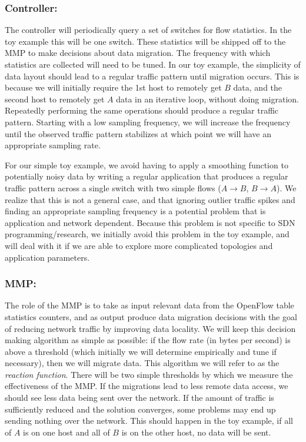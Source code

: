 \documentclass[12pt]{article} \usepackage{graphicx} \usepackage{amsmath}
\begin{document}
\subsubsection*{Controller:} \label{controller} The controller will periodically
query a set of switches for flow statistics. In the toy example this will be one
switch.  These statistics will be shipped off to the MMP to make decisions about
data migration.  The frequency with which statistics are collected will need to
be tuned.  In our toy example, the simplicity of data layout should lead to a
regular traffic pattern until migration occurs.  This is because we will
initially require the 1st host to remotely get $B$ data, and the second host to
remotely get $A$ data in an iterative loop, without doing migration.  Repeatedly
performing the same operations should produce a regular traffic pattern.
Starting with a low sampling frequency, we will increase the frequency until the
observed traffic pattern stabilizes at which point we will have an appropriate
sampling rate.

For our simple toy example, we avoid having to apply a smoothing function to
potentially noisy data by writing a regular application that produces a regular
traffic pattern across a single switch with two simple flows ($A\rightarrow B$,
$B\rightarrow A$).  We realize that this is not a general case, and that
ignoring outlier traffic spikes and finding an appropriate sampling frequency is
a potential problem that is application and network dependent.  Because this
problem is not specific to SDN programming/research, we initially avoid this
problem in the toy example, and will deal with it if we are able to explore more complicated
topologies and application parameters. %


\subsubsection*{MMP:} \label{mmp} The role of the MMP is to take as input
relevant data from the OpenFlow table statistics counters, and as output produce
data migration decisions with the goal of reducing network traffic by improving
data locality.  We will keep this decision making algorithm as simple as
possible: if the flow rate (in bytes per second) is above a threshold (which
initially we will determine empirically and tune if necessary), then we will
migrate data.  This algorithm we will refer to as the \textit{reaction
function}. There will be two simple thresholds by which we measure the effectiveness of the MMP. If the migrations lead to less remote data access, we should see less data being sent over the network. If the amount of traffic is sufficiently reduced and the solution converges, some problems may end up sending nothing over the network. This should happen in the toy example, if all of $A$ is on one host and all of $B$ is on the other host, no data will be sent. 
\end{document}
